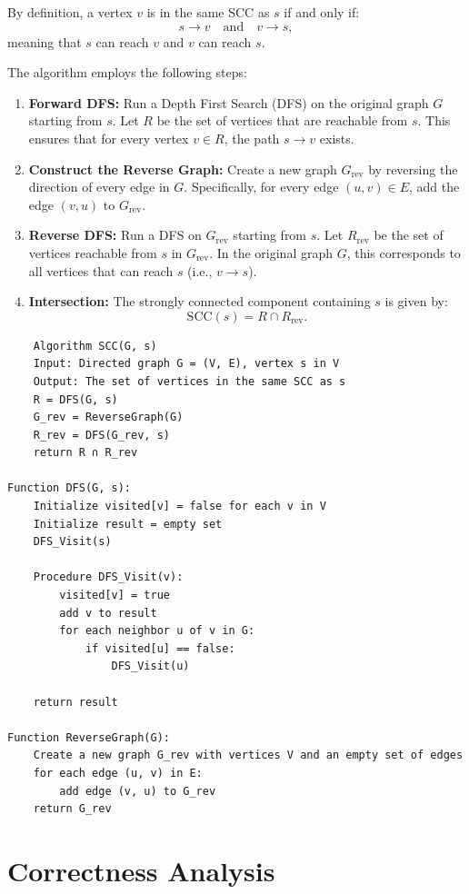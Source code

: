 \documentclass[letterpaper, 11pt]{article}
\newcommand{\1}{\mathds{1}}	%
\theoremstyle{definition}
\newenvironment{solution}{{\par\noindent\it Solution.}}{}
\begin{document}
\begin{solution}
By definition, a vertex \(v\) is in the same SCC as \(s\) if and only if:
\[
s \rightarrow v \quad \text{and} \quad v \rightarrow s,
\]
meaning that \(s\) can reach \(v\) and \(v\) can reach \(s\).

The algorithm employs the following steps:
\begin{enumerate}
    \item \textbf{Forward DFS:} Run a Depth First Search (DFS) on the original graph \(G\) starting from \(s\). Let \(R\) be the set of vertices that are reachable from \(s\). This ensures that for every vertex \(v \in R\), the path \(s \rightarrow v\) exists.
    \item \textbf{Construct the Reverse Graph:} Create a new graph \(G_{\text{rev}}\) by reversing the direction of every edge in \(G\). Specifically, for every edge \((u, v) \in E\), add the edge \((v, u)\) to \(G_{\text{rev}}\).
    \item \textbf{Reverse DFS:} Run a DFS on \(G_{\text{rev}}\) starting from \(s\). Let \(R_{\text{rev}}\) be the set of vertices reachable from \(s\) in \(G_{\text{rev}}\). In the original graph \(G\), this corresponds to all vertices that can reach \(s\) (i.e., \(v \rightarrow s\)).
    \item \textbf{Intersection:} The strongly connected component containing \(s\) is given by:
    \[
    \text{SCC}(s) = R \cap R_{\text{rev}}.
    \]
\end{enumerate}
\begin{lstlisting}
    Algorithm SCC(G, s)
    Input: Directed graph G = (V, E), vertex s in V
    Output: The set of vertices in the same SCC as s
    R = DFS(G, s)
    G_rev = ReverseGraph(G)
    R_rev = DFS(G_rev, s)
    return R ∩ R_rev

Function DFS(G, s):
    Initialize visited[v] = false for each v in V
    Initialize result = empty set
    DFS_Visit(s)
    
    Procedure DFS_Visit(v):
        visited[v] = true
        add v to result
        for each neighbor u of v in G:
            if visited[u] == false:
                DFS_Visit(u)
                
    return result

Function ReverseGraph(G):
    Create a new graph G_rev with vertices V and an empty set of edges
    for each edge (u, v) in E:
        add edge (v, u) to G_rev
    return G_rev
\end{lstlisting}
\section*{Correctness Analysis}


\end{solution}
\end{document}

